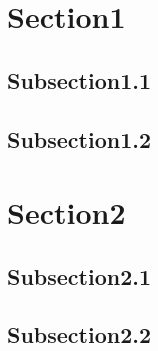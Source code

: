 \documentclass{beamer}
\begin{document}
\section{Section1}
\subsection{Subsection1.1}
\subsection{Subsection1.2}
\section{Section2}
\subsection{Subsection2.1}
\subsection{Subsection2.2}
\end{document}
